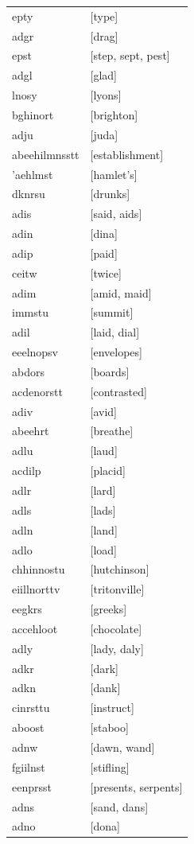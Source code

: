 \documentclass{article}
\begin{document}
\begin{tabular}{ll}
epty & [type] \\
adgr & [drag] \\
epst & [step, sept, pest] \\
adgl & [glad] \\
lnosy & [lyons] \\
bghinort & [brighton] \\
adju & [juda] \\
abeehilmnsstt & [establishment] \\
'aehlmst & [hamlet's] \\
dknrsu & [drunks] \\
adis & [said, aids] \\
adin & [dina] \\
adip & [paid] \\
ceitw & [twice] \\
adim & [amid, maid] \\
immstu & [summit] \\
adil & [laid, dial] \\
eeelnopsv & [envelopes] \\
abdors & [boards] \\
acdenorstt & [contrasted] \\
adiv & [avid] \\
abeehrt & [breathe] \\
adlu & [laud] \\
acdilp & [placid] \\
adlr & [lard] \\
adls & [lads] \\
adln & [land] \\
adlo & [load] \\
chhinnostu & [hutchinson] \\
eiillnorttv & [tritonville] \\
eegkrs & [greeks] \\
accehloot & [chocolate] \\
adly & [lady, daly] \\
adkr & [dark] \\
adkn & [dank] \\
cinrsttu & [instruct] \\
aboost & [staboo] \\
adnw & [dawn, wand] \\
fgiilnst & [stifling] \\
eenprsst & [presents, serpents] \\
adns & [sand, dans] \\
adno & [dona] \\

\end{tabular}
\end{document}
